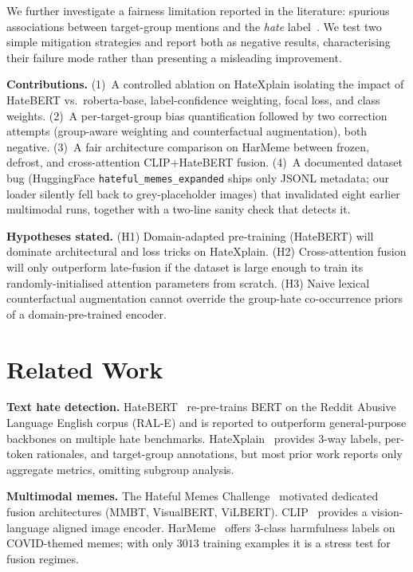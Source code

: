 \documentclass[10pt,a4paper,twocolumn]{article}
\begin{document}
We further investigate a fairness limitation reported in the literature: spurious associations between target-group mentions and the \emph{hate} label~\cite{davidson,sap}. We test two simple mitigation strategies and report both as negative results, characterising their failure mode rather than presenting a misleading improvement.

\textbf{Contributions.} (1)~A controlled ablation on HateXplain isolating the impact of HateBERT vs.\ roberta-base, label-confidence weighting, focal loss, and class weights. (2)~A per-target-group bias quantification followed by two correction attempts (group-aware weighting and counterfactual augmentation), both negative. (3)~A fair architecture comparison on HarMeme between frozen, defrost, and cross-attention CLIP+HateBERT fusion. (4)~A documented dataset bug (HuggingFace \texttt{hateful\_memes\_expanded} ships only JSONL metadata; our loader silently fell back to grey-placeholder images) that invalidated eight earlier multimodal runs, together with a two-line sanity check that detects it.

\textbf{Hypotheses stated.} (H1) Domain-adapted pre-training (HateBERT) will dominate architectural and loss tricks on HateXplain. (H2) Cross-attention fusion will only outperform late-fusion if the dataset is large enough to train its randomly-initialised attention parameters from scratch. (H3) Naive lexical counterfactual augmentation cannot override the group-hate co-occurrence priors of a domain-pre-trained encoder.

\section{Related Work}

\textbf{Text hate detection.} HateBERT~\cite{hatebert} re-pre-trains BERT on the Reddit Abusive Language English corpus (RAL-E) and is reported to outperform general-purpose backbones on multiple hate benchmarks. HateXplain~\cite{hatexplain} provides 3-way labels, per-token rationales, and target-group annotations, but most prior work reports only aggregate metrics, omitting subgroup analysis.

\textbf{Multimodal memes.} The Hateful Memes Challenge~\cite{kiela} motivated dedicated fusion architectures (MMBT, VisualBERT, ViLBERT). CLIP~\cite{clip} provides a vision-language aligned image encoder. HarMeme~\cite{harmeme} offers 3-class harmfulness labels on COVID-themed memes; with only $3013$ training examples it is a stress test for fusion regimes.
\end{document}
